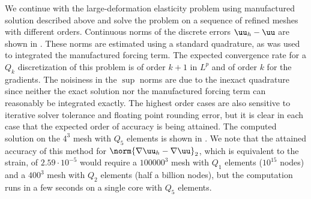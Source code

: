 We continue with the large-deformation elasticity problem using manufactured solution described above and solve the problem on a sequence of refined meshes with different orders.
Continuous norms of the discrete errors $\uu_h - \uu$ are shown in .
These norms are estimated using a standard quadrature, as was used to integrated the manufactured forcing term.
The expected convergence rate for a $Q_k$ discretization of this problem is of order $k+1$ in $L^p$ and of order $k$ for the gradients.
The noisiness in the $\sup$ norms are due to the inexact quadrature since neither the exact solution nor the manufactured forcing term can reasonably be integrated exactly.
The highest order cases are also sensitive to iterative solver tolerance and floating point rounding error, but it is clear in each case that the expected order of accuracy is being attained.
The computed solution on the $4^3$ mesh with $Q_5$ elements is shown in .
We note that the attained accuracy of this method for $\norm{\nabla \uu_h - \nabla\uu}_2$, which is equivalent to the strain, of $2.59\cdot 10^{-5}$ would require a $100000^3$ mesh with $Q_1$ elements ($10^{15}$ nodes) and a $400^3$ mesh with $Q_2$ elements (half a billion nodes), but the computation runs in a few seconds on a single core with $Q_5$ elements.

